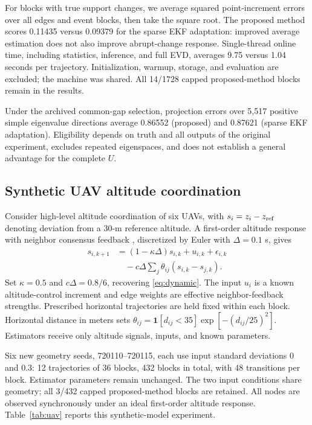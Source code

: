 \documentclass[journal]{IEEEtran}
\begin{document}
For blocks with true support changes, we average squared point-increment errors over all edges and event blocks, then take the square root. The proposed method scores 0.11435 versus 0.09379 for the sparse EKF adaptation: improved average estimation does not also improve abrupt-change response. Single-thread online time, including statistics, inference, and full EVD, averages 9.75 versus 1.04 seconds per trajectory. Initialization, warmup, storage, and evaluation are excluded; the machine was shared. All 14/1728 capped proposed-method blocks remain in the results. 

Under the archived common-gap selection, projection errors over 5,517 positive simple eigenvalue directions average 0.86552 (proposed) and 0.87621 (sparse EKF adaptation). Eligibility depends on truth and all outputs of the original experiment, excludes repeated eigenspaces, and does not establish a general advantage for the complete $U$.

\subsection{Synthetic UAV altitude coordination}
Consider high-level altitude coordination of six UAVs, with $s_i=z_i-z_{\rm ref}$ denoting deviation from a 30-m reference altitude. A first-order altitude response with neighbor consensus feedback \cite{consensus}, discretized by Euler with $\Delta=0.1$ s, gives
\begin{equation}
\begin{split}
s_{i,k+1}&=(1-\kappa\Delta)s_{i,k}+u_{i,k}+\epsilon_{i,k}\\
&\quad-c\Delta\sum_j\theta_{ij}(s_{i,k}-s_{j,k}).
\end{split}
\end{equation}
Set $\kappa=0.5$ and $c\Delta=0.8/6$, recovering \eqref{eq:dynamic}. The input $u_i$ is a known altitude-control increment and edge weights are effective neighbor-feedback strengths. Prescribed horizontal trajectories are held fixed within each block. Horizontal distance in meters sets $\theta_{ij}=\mathbf1[d_{ij}<35]\exp[-(d_{ij}/25)^2]$. Estimators receive only altitude signals, inputs, and known parameters.

Six new geometry seeds, 720110--720115, each use input standard deviations 0 and 0.3: 12 trajectories of 36 blocks, 432 blocks in total, with 48 transitions per block. Estimator parameters remain unchanged. The two input conditions share geometry; all 3/432 capped proposed-method blocks are retained. All nodes are observed synchronously under an ideal first-order altitude response. Table~\ref{tab:uav} reports this synthetic-model experiment.
\end{document}
